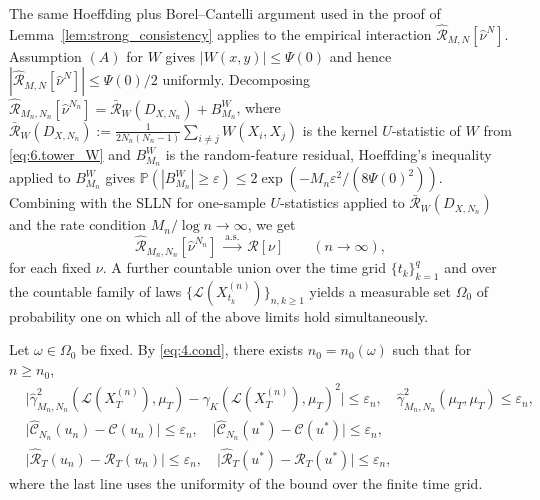\documentclass[11pt,leqno]{article}
\theoremstyle{plain}
\theoremstyle{remark}
\theoremstyle{definition}
\numberwithin{equation}{section}
\numberwithin{figure}{section}
\numberwithin{table}{section}
\numberwithin{algorithm}{section}
\begin{document}
The same Hoeffding plus Borel--Cantelli argument used in the proof of Lemma~\ref{lem:strong_consistency}
applies to the empirical interaction $\hat{\mathcal{R}}_{M,N}[\hat\nu^N]$.
Assumption $(A)$ for $W$ gives $|W(x,y)|\le \Psi(0)$ and hence
$|\hat{\mathcal{R}}_{M,N}[\hat\nu^N]|\le\Psi(0)/2$ uniformly.
Decomposing $\hat{\mathcal{R}}_{M_n,N_n}[\hat\nu^{N_n}] = \bar{\mathcal{R}}_W(D_{X,N_n}) + B^W_{M_n}$,
where $\bar{\mathcal{R}}_W(D_{X,N_n}):=\frac{1}{2N_n(N_n-1)}\sum_{i\neq j}W(X_i,X_j)$ is the kernel $U$-statistic of $W$ from \eqref{eq:6.tower_W}
and $B^W_{M_n}$ is the random-feature residual,
Hoeffding's inequality applied to $B^W_{M_n}$ gives
$\mathbb{P}(|B^W_{M_n}|\ge\varepsilon)\le 2\exp(-M_n\varepsilon^2/(8\Psi(0)^2))$.
Combining with the SLLN for one-sample $U$-statistics
\cite[Section~5.4]{ser:1980} applied to $\bar{\mathcal{R}}_W(D_{X,N_n})$ and the rate condition $M_n/\log n\to\infty$, we get 
\begin{equation}\label{eq:6.R_LLN}
 \hat{\mathcal{R}}_{M_n,N_n}[\hat\nu^{N_n}]\;\xrightarrow{\mathrm{a.s.}}\;\mathcal{R}[\nu]\qquad (n\to\infty),
\end{equation}
for each fixed $\nu$.
A further countable union over the time grid $\{t_k\}_{k=1}^{q}$
and over the countable family of laws $\{\mathcal{L}(X_{t_k}^{(n)})\}_{n,k\ge 1}$
yields a measurable set $\Omega_0$ of probability one on which all of the above limits hold simultaneously.

Let $\omega\in\Omega_0$ be fixed.
By \eqref{eq:4.cond}, there exists $n_0=n_0(\omega)$ such that for $n\ge n_0$,
\begin{equation}\label{eq:6.LLN}
\begin{aligned}
 &\bigl|\hat{\gamma}_{M_n,N_n}^2(\mathcal{L}(X_T^{(n)}),\mu_T) - \gamma_K(\mathcal{L}(X_T^{(n)}),\mu_T)^2\bigr|\le \varepsilon_n,\quad
  \hat{\gamma}_{M_n,N_n}^2(\mu_T,\mu_T)\le \varepsilon_n,\\
 &\bigl|\hat{\mathcal{C}}_{N_n}(u_n) - \mathcal{C}(u_n)\bigr| \le \varepsilon_n,\quad
  \bigl|\hat{\mathcal{C}}_{N_n}(u^*) - \mathcal{C}(u^*)\bigr| \le \varepsilon_n,\\
 &\bigl|\hat{\mathcal{R}}_T(u_n)-\mathcal{R}_T(u_n)\bigr|\le \varepsilon_n,\quad
  \bigl|\hat{\mathcal{R}}_T(u^*)-\mathcal{R}_T(u^*)\bigr|\le \varepsilon_n,
\end{aligned}
\end{equation}
where the last line uses the uniformity of the bound over the finite time grid.
\end{document}
